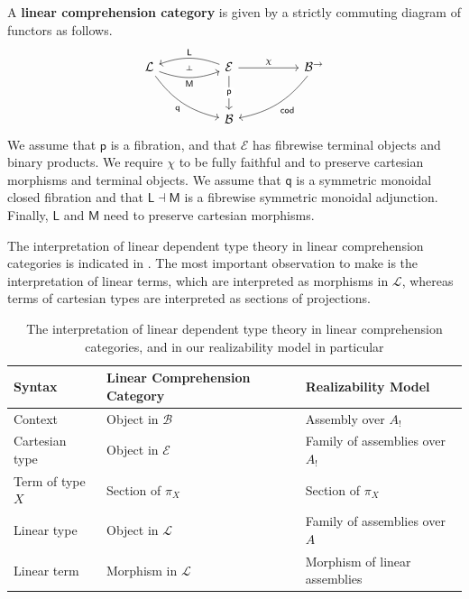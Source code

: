 \documentclass[a4paper,UKenglish,cleveref,numberwithinsect, autoref, thm-restate]{lipics-v2021}
\newcommand{\Base}{\mathcal{B}}
\newcommand{\Total}{\mathcal{E}}
\newcommand{\fib}{\mathsf{p}}
\newcommand{\comp}{\chi}
\newcommand{\Arrow}[1]{#1^{\rightarrow}}
\newcommand{\cod}{\mathsf{cod}}
\newcommand{\proj}[1]{\pi_{#1}}
\newcommand{\TotalL}{\mathcal{L}}
\newcommand{\fibM}{\mathsf{q}}
\newcommand{\linL}{\mathsf{L}}
\newcommand{\linM}{\mathsf{M}}
\newcommand{\LCA}{A}
\newcommand{\LCAtoPCA}[1]{#1_!}
\begin{document}
\begin{definition}
\label{def:linear-comp-cat}
A \textbf{linear comprehension category} is given by a strictly commuting diagram of functors as follows.
\[
\begin{tikzcd}[column sep = huge, row sep = large]
	\TotalL & \Total & {\Arrow{\Base}} \\
	& \Base
	\arrow[""{name=0, anchor=center, inner sep=0}, "\linM"', bend right=20, from=1-1, to=1-2]
	\arrow["\fibM"', bend right=20, from=1-1, to=2-2]
	\arrow[""{name=1, anchor=center, inner sep=0}, "\linL"', bend right=20, from=1-2, to=1-1]
	\arrow["\comp", from=1-2, to=1-3]
	\arrow["\fib"{description}, from=1-2, to=2-2]
	\arrow["\cod", bend left=20, from=1-3, to=2-2]
	\arrow["\dashv"{anchor=center, rotate=-90}, draw=none, from=0, to=1]
\end{tikzcd}
\]
We assume that $\fib$ is a fibration,
and that $\Total$ has fibrewise terminal objects and binary products.
We require $\comp$ to be fully faithful
and to preserve cartesian morphisms and terminal objects.
We assume that $\fibM$ is a symmetric monoidal closed fibration
and that $\linL \dashv \linM$ is a fibrewise symmetric monoidal adjunction.
Finally,
$\linL$ and $\linM$ need to preserve cartesian morphisms.
\end{definition}

The interpretation of linear dependent type theory in linear comprehension categories is indicated in .
The most important observation to make is the interpretation of linear terms,
which are interpreted as morphisms in $\TotalL$,
whereas terms of cartesian types are interpreted as sections of projections.

\begin{table}[t!]
\centering
\begin{tabular}{||l l l||}
\hline
Syntax         & Linear Comprehension Category & Realizability Model                          \\
[0.5ex] 
\hline\hline
Context        & Object in $\Base$             & Assembly over  $\LCAtoPCA{\LCA}$            \\
Cartesian type & Object in $\Total$            & Family of assemblies over $\LCAtoPCA{\LCA}$ \\
Term of type $X$           & Section of $\proj{X}$            & Section of $\proj{X}$                           \\
Linear type    & Object in $\TotalL$           & Family of assemblies over $\LCA$             \\
Linear term    & Morphism in $\TotalL$         & Morphism of linear assemblies \\ [1ex] \hline
\end{tabular}
\caption{The interpretation of linear dependent type theory in linear comprehension categories, and in our realizability model in particular}
\label{tab:interpretation}
\end{table}
\end{document}
